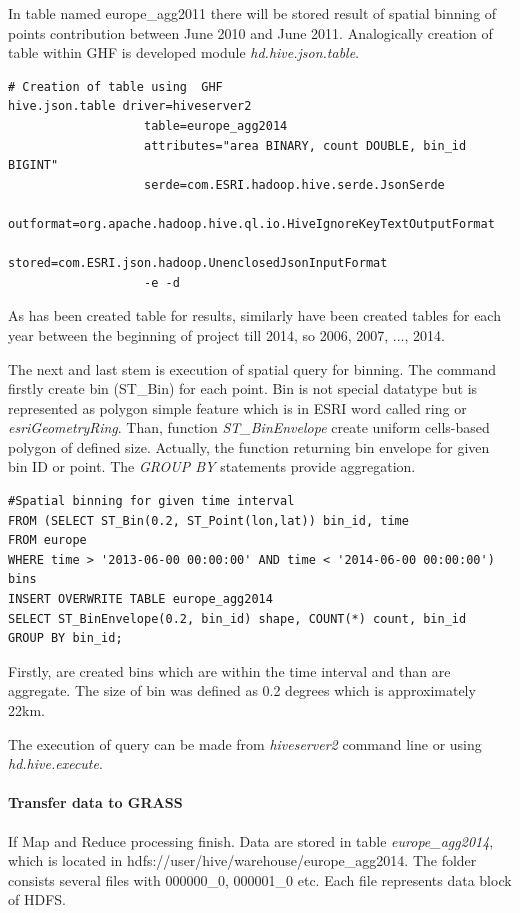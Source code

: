 \documentclass[a4paper,12pt,oneside]{report}
\begin{document}
	In table named europe\_agg2011 there will be stored result of spatial binning of points contribution between June 2010 and June 2011.
	Analogically creation of table within GHF is developed module \textit{hd.hive.json.table}.
\newpage
\begin{footnotesize}
	\begin{lstlisting}[style=python]
# Creation of table using  GHF
hive.json.table driver=hiveserver2
                   table=europe_agg2014
                   attributes="area BINARY, count DOUBLE, bin_id BIGINT"
                   serde=com.ESRI.hadoop.hive.serde.JsonSerde
                   outformat=org.apache.hadoop.hive.ql.io.HiveIgnoreKeyTextOutputFormat
                   stored=com.ESRI.json.hadoop.UnenclosedJsonInputFormat
                   -e -d
	\end{lstlisting}
\end{footnotesize}
	As has been created table for results, similarly have been created tables for each year between 
	the beginning of project till 2014, so 2006, 2007, ..., 2014. 
	
	
	The next and last stem is execution of spatial query for binning. The command firstly create bin (ST\_Bin) for each point. Bin is not special datatype but is represented as polygon simple feature which is in ESRI word called ring or \textit{esriGeometryRing}. Than, function \textit{ST\_BinEnvelope} create uniform  cells-based polygon of defined size. Actually, the function returning bin envelope for given bin ID or point. The \textit{GROUP BY} statements provide aggregation.
\begin{footnotesize}
	\begin{lstlisting}[style=python]
#Spatial binning for given time interval
FROM (SELECT ST_Bin(0.2, ST_Point(lon,lat)) bin_id, time 
FROM europe 
WHERE time > '2013-06-00 00:00:00' AND time < '2014-06-00 00:00:00') bins
INSERT OVERWRITE TABLE europe_agg2014
SELECT ST_BinEnvelope(0.2, bin_id) shape, COUNT(*) count, bin_id 
GROUP BY bin_id;
	\end{lstlisting}
\end{footnotesize}
	Firstly, are created bins which are within the time interval and than are aggregate.
	The size of bin was defined as 0.2 degrees which is approximately 22km.
	
	The execution of query can be made from \textit{hiveserver2} command line or using \newline \textit{hd.hive.execute}. 
	
	\paragraph{Transfer data to GRASS}
	If Map and Reduce processing finish. Data are stored in table \textit{europe\_agg2014}, 
	which is located in hdfs://user/hive/warehouse/europe\_agg2014. The folder consists several
	files with 000000\_0, 000001\_0 etc. Each file represents data block of HDFS.  
\end{document}
